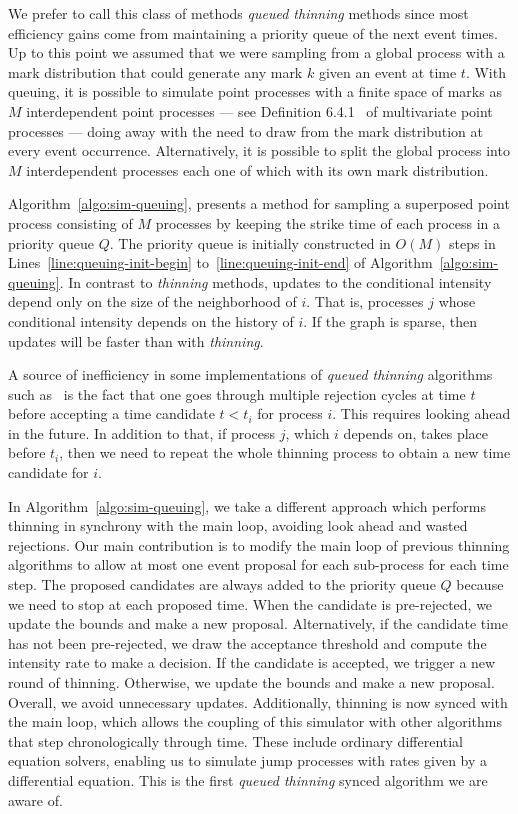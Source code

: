\documentclass{juliacon}
\numberwithin{equation}{section}
\begin{document}
We prefer to call this class of methods \textit{queued thinning} methods since most efficiency gains come from maintaining a priority queue of the next event times. Up to this point we assumed that we were sampling from a global process with a mark distribution that could generate any mark \( k \) given an event at time \( t \). With queuing, it is possible to simulate point processes with a finite space of marks as \( M \) interdependent point processes --- see Definition 6.4.1~\cite{daley2003} of multivariate point processes --- doing away with the need to draw from the mark distribution at every event occurrence. Alternatively, it is possible to split the global process into \( M \) interdependent processes each one of which with its own mark distribution.

Algorithm~\ref{algo:sim-queuing}, presents a method for sampling a superposed point process consisting of \( M \) processes by keeping the strike time of each process in a priority queue \( Q \). The priority queue is initially constructed in \( O(M) \) steps in Lines~\ref{line:queuing-init-begin} to~\ref{line:queuing-init-end} of Algorithm~\ref{algo:sim-queuing}. In contrast to \textit{thinning} methods, updates to the conditional intensity depend only on the size of the neighborhood of \( i \). That is, processes \( j \) whose conditional intensity depends on the history of \( i \). If the graph is sparse, then updates will be faster than with \textit{thinning}.

A source of inefficiency in some implementations of \textit{queued thinning} algorithms such as~\cite{farajtabar2017} is the fact that one goes through multiple rejection cycles at time \( t \) before accepting a time candidate \( t < t_i \) for process \( i \). This requires looking ahead in the future. In addition to that, if process \( j \), which \( i \) depends on, takes place before \( t_i \), then we need to repeat the whole thinning process to obtain a new time candidate for \( i \).

In Algorithm~\ref{algo:sim-queuing}, we take a different approach which performs thinning in synchrony with the main loop, avoiding look ahead and wasted rejections. Our main contribution is to modify the main loop of previous thinning algorithms to allow at most one event proposal for each sub-process for each time step. The proposed candidates are always added to the priority queue \( Q \) because we need to stop at each proposed time. When the candidate is pre-rejected, we update the bounds and make a new proposal. Alternatively, if the candidate time has not been pre-rejected, we draw the acceptance threshold and compute the intensity rate to make a decision. If the candidate is accepted, we trigger a new round of thinning. Otherwise, we update the bounds and make a new proposal. Overall, we avoid unnecessary updates. Additionally, thinning is now synced with the main loop, which allows the coupling of this simulator with other algorithms that step chronologically through time. These include ordinary differential equation solvers, enabling us to simulate jump processes with rates given by a differential equation. This is the first \textit{queued thinning} synced algorithm we are aware of.
\end{document}
